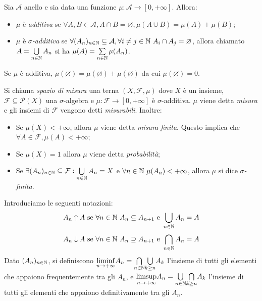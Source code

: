 \begin{definition}
	Sia $\mathcal{A}$ anello e sia data una funzione $\mu:\mathcal{A} \rightarrow[0,+\infty]$. Allora:
	\begin{itemize}
		\item $\mu$ è \emph{additiva} se $\forall A,B \in \mathcal{A}, A\cap B=\varnothing, \mu( A\cup B)=\mu(A)+\mu(B)$;
		\item $\mu$ è \emph{$\sigma$-additiva} se $\forall (A_n)_{n\in\mathbb{N}}\subseteq \mathcal{A}, \forall i\neq j \in \mathbb{N} \ A_i\cap A_j =\varnothing$, allora chiamato $ A=\bigcup\limits_{n\in\mathbb{N}}A_n$ si ha $\mu(A)=\sum\limits_{n\in\mathbb{N}} \mu(A_n)$.
	\end{itemize}
\end{definition}

\begin{oss}
	Se $\mu$ è additiva, $\mu(\varnothing)=\mu(\varnothing)+\mu(\varnothing)$ da cui $\mu(\varnothing)=0$.
\end{oss}

\begin{definition}
	Si chiama \emph{spazio di misura} una terna $(X,\mathcal{F}, \mu)$ dove $X$ è un insieme, ${\mathcal{F}\subseteq \mathscr{P}(X)}$ una $\sigma$-algebra e $\mu\colon\mathcal{F} \to [0,+\infty]$ è $\sigma$-additiva. $\mu$ viene detta \emph{misura} e gli insiemi di $\mathcal{F}$ vengono detti \emph{misurabili}.
	Inoltre:
	\begin{itemize}
		\item Se $\mu(X)<+\infty$, allora $\mu$ viene detta \emph{misura finita}. Questo implica che $\forall A \in \mathcal{F}, {\mu(A) < +\infty} $;
		\item Se $\mu(X)=1$ allora $\mu$ viene detta \emph{probabilità};
		\item Se $\exists (A_n)_{n\in\mathbb{N}}\subseteq\mathcal{F} : \bigcup\limits_{n\in\mathbb{N}}A_n=X$ e $\forall n \in\mathbb{N} \ \mu(A_n) <+\infty$, allora $\mu$ si dice \emph{$\sigma$-finita}.
	\end{itemize}
\end{definition}
Introduciamo le seguenti notazioni:
\[ A_n \uparrow   A \text{ se } \forall n \in\mathbb{N} \ A_n \subseteq A_{n+1} \text{ e } \bigcup\limits_{n\in \mathbb{N}}A_n = A \]
\[ A_n \downarrow A \text{ se } \forall n \in\N \ A_n \supseteq A_{n+1} \text{ e } \bigcap\limits_{n\in \N}A_n = A \]
Dato $(A_n)_{n\in\mathbb{N}}$, si definiscono $\underset{n\to+\infty}{\operatorname{liminf}}A_n=\underset{n\in\mathbb{N}}{\bigcap}\underset{k\geq n}{\bigcup}A_k$ l'insieme di tutti gli elementi che appaiono frequentemente tra gli $A_n$, e $\underset{n\to +\infty}{\text{limsup}}A_n=\underset{n\in\mathbb{N}}{\bigcup}\underset{k\geq n}{\bigcap}A_k$ l'insieme di tutti gli elementi che appaiono definitivamente tra gli $A_n$.

